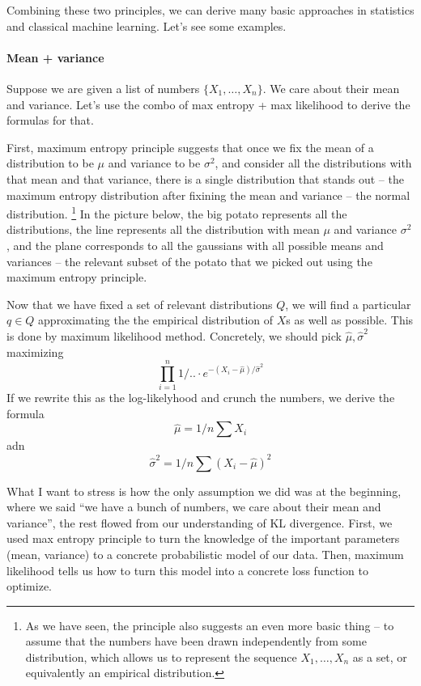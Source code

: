 \documentclass{article}
\begin{document}
Combining these two principles, we can derive many basic approaches in statistics and classical machine learning. Let's see some examples. 

\paragraph{Mean + variance}

Suppose we are given a list of numbers $\{X_1, \dots, X_n\}$. We care about their mean and variance. Let's use the combo of max entropy + max likelihood to derive the formulas for that. 

First, maximum entropy principle suggests that once we fix the mean of a distribution to be $\mu$ and variance to be $\sigma^2$, and consider all the distributions with that mean and that variance, there is a single distribution that stands out -- the maximum entropy distribution after fixining the mean and variance -- the normal distribution. \footnote{As we have seen, the principle also suggests an even more basic thing -- to assume that the numbers have been drawn independently from some distribution, which allows us to represent the sequence $X_1, \dots, X_n$ as a set, or equivalently an empirical distribution. }
In the picture below, the big potato represents all the distributions, the line represents all the distribution with mean $\mu$ and variance $\sigma^2$, and the plane corresponds to all the gaussians with all possible means and variances -- the relevant subset of the potato that we picked out using the maximum entropy principle. 

Now that we have fixed a set of relevant distributions $Q$, we will find a particular $q \in Q$ approximating the the empirical distribution of $X$s as well as possible. This is done by maximum likelihood method. Concretely, we should pick $\hat\mu, \hat\sigma^2$ maximizing
\[
\prod_{i=1}^n 1/.. \cdot e^{-(X_i - \hat\mu)/\hat\sigma^2}
\]
If we rewrite this as the log-likelyhood and crunch the numbers, we derive the formula 
\[
\hat\mu = 1/n \sum X_i
\]
adn
\[
\hat\sigma^2 = 1/n \sum (X_i - \hat\mu)^2
\]

What I want to stress is how the only assumption we did was at the beginning, where we said ``we have a bunch of numbers, we care about their mean and variance'', the rest flowed from our understanding of KL divergence. First, we used max entropy principle to turn the knowledge of the important parameters (mean, variance) to a concrete probabilistic model of our data. Then, maximum likelihood tells us how to turn this model into a concrete loss function to optimize. 
\end{document}
